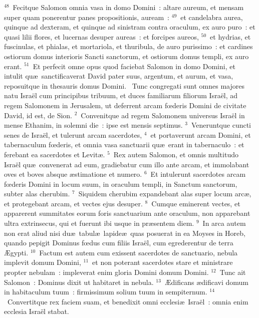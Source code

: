 ${}^{48}$~Fecitque Salomon omnia vasa in domo Domini~: altare aureum, et mensam super quam ponerentur panes propositionis, auream~:
${}^{49}$~et candelabra aurea, quinque ad dexteram, et quinque ad sinistram contra oraculum, ex auro puro~: et quasi lilii flores, et lucernas desuper aureas~: et forcipes aureos,
${}^{50}$~et hydrias, et fuscinulas, et phialas, et mortariola, et thuribula, de auro purissimo~: et cardines ostiorum domus interioris Sancti sanctorum, et ostiorum domus templi, ex auro erant.
${}^{51}$~Et perfecit omne opus quod faciebat Salomon in domo Domini, et intulit qu\ae\ sanctificaverat David pater suus, argentum, et aurum, et vasa, reposuitque in thesauris domus Domini.
~Tunc congregati sunt omnes majores natu Isra\"el cum principibus tribuum, et duces familiarum filiorum Isra\"el, ad regem Salomonem in Jerusalem, ut deferrent arcam fœderis Domini de civitate David, id est, de Sion.
${}^{2}$~Convenitque ad regem Salomonem universus Isra\"el in mense Ethanim, in solemni die~: ipse est mensis septimus.
${}^{3}$~Veneruntque cuncti senes de Isra\"el, et tulerunt arcam sacerdotes,
${}^{4}$~et portaverunt arcam Domini, et tabernaculum fœderis, et omnia vasa sanctuarii qu\ae\ erant in tabernaculo~: et ferebant ea sacerdotes et Levit\ae .
${}^{5}$~Rex autem Salomon, et omnis multitudo Isra\"el qu\ae\ convenerat ad eum, gradiebatur cum illo ante arcam, et immolabant oves et boves absque \ae stimatione et numero.
${}^{6}$~Et intulerunt sacerdotes arcam fœderis Domini in locum suum, in oraculum templi, in Sanctum sanctorum, subter alas cherubim.
${}^{7}$~Siquidem cherubim expandebant alas super locum arc\ae , et protegebant arcam, et vectes ejus desuper.
${}^{8}$~Cumque eminerent vectes, et apparerent summitates eorum foris sanctuarium ante oraculum, non apparebant ultra extrinsecus, qui et fuerunt ibi usque in pr\ae sentem diem.
${}^{9}$~In arca autem non erat aliud nisi du\ae\ tabul\ae\ lapide\ae\ quas posuerat in ea Moyses in Horeb, quando pepigit Dominus fœdus cum filiis Isra\"el, cum egrederentur de terra \AE gypti.
${}^{10}$~Factum est autem cum exissent sacerdotes de sanctuario, nebula implevit domum Domini,
${}^{11}$~et non poterant sacerdotes stare et ministrare propter nebulam~: impleverat enim gloria Domini domum Domini.
${}^{12}$~Tunc ait Salomon~: Dominus dixit ut habitaret in nebula.
${}^{13}$~\AE dificans \ae dificavi domum in habitaculum tuum~: firmissimum solium tuum in sempiternum.
${}^{14}$~Convertitque rex faciem suam, et benedixit omni ecclesi\ae\ Isra\"el~: omnia enim ecclesia Isra\"el stabat.
